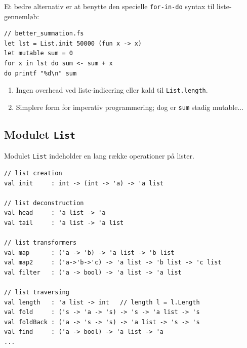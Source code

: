 \documentclass[rgb]{beamer}
\begin{document}
\begin{frame}[fragile]
\begin{footnotesize}

\vspace{2ex}

Et bedre alternativ er at benytte den specielle \lstinline{for-in-do}
syntax til liste-gennemløb:

\vspace{1ex}

\begin{lstlisting}[numbers=none,frame=none,mathescape]
// better_summation.fs
let lst = List.init 50000 (fun x -> x)
let mutable sum = 0
for x in lst do sum <- sum + x
do printf "%d\n" sum
\end{lstlisting}

\vspace{1ex}

\begin{enumerate}
\item Ingen overhead ved liste-indicering eller kald til \lstinline{List.length}.
\item Simplere form for imperativ programmering; dog er \lstinline{sum} stadig mutable...
\end{enumerate}
\end{footnotesize}
\end{frame}

\subsection{Modulet \lstinline{List}}

\begin{frame}[fragile]
\begin{footnotesize}


\vspace{1ex}

Modulet \lstinline{List} indeholder en lang række operationer på
lister.

\begin{lstlisting}[numbers=none]
// list creation
val init     : int -> (int -> 'a) -> 'a list

// list deconstruction
val head     : 'a list -> 'a
val tail     : 'a list -> 'a list

// list transformers
val map      : ('a -> 'b) -> 'a list -> 'b list
val map2     : ('a->'b->'c) -> 'a list -> 'b list -> 'c list
val filter   : ('a -> bool) -> 'a list -> 'a list

// list traversing
val length   : 'a list -> int   // length l = l.Length
val fold     : ('s -> 'a -> 's) -> 's -> 'a list -> 's
val foldBack : ('a -> 's -> 's) -> 'a list -> 's -> 's
val find     : ('a -> bool) -> 'a list -> 'a
...
\end{lstlisting}
\end{footnotesize}

\end{frame}
\end{document}
